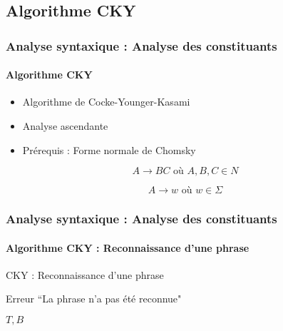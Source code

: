 \documentclass[xcolor=table]{beamer}
\begin{document}
\subsection{Algorithme CKY}

\begin{frame}
\frametitle{Analyse syntaxique : Analyse des constituants}
\framesubtitle{Algorithme CKY}

\begin{itemize}
	\item Algorithme de Cocke-Younger-Kasami
	\item Analyse ascendante
	\item Prérequis : Forme normale de Chomsky
\end{itemize}

\begin{definition}
	\[
	A \rightarrow  B C \text{ où } A, B, C \in N
	\]
	
	\[
	A \rightarrow w \text{ où } w \in \Sigma
	\]
\end{definition}

\end{frame}

\begin{frame}
\frametitle{Analyse syntaxique : Analyse des constituants}
\framesubtitle{Algorithme CKY : Reconnaissance d'une phrase}

\vspace{-6pt}
\begin{block}{CKY : Reconnaissance d'une phrase}
	\scriptsize\vspace{-3pt}
	\begin{algorithm}[H]
		
		
	
		 {
			Erreur ``La phrase n'a pas été reconnue"\;
		}
	
		\Retour $T, B$ \;
		\vspace{-3pt}
	\end{algorithm}
\end{block}

\end{frame}
\end{document}
